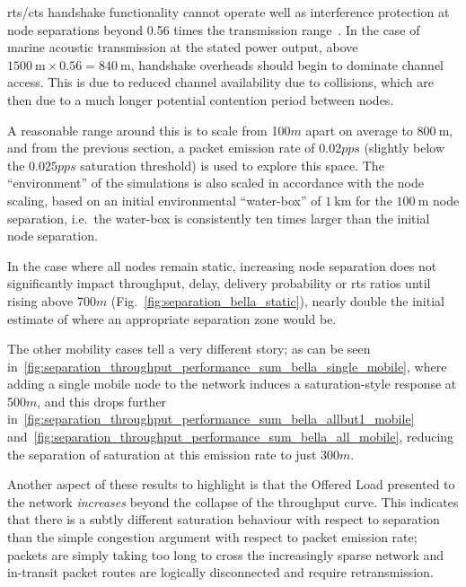 \gls{rts}/\gls{cts} handshake functionality cannot operate well as interference protection at node separations beyond 0.56 times the transmission range~\cite{Xu2002}.
In the case of marine acoustic transmission at the stated power output, above $\SI{1500}{\meter} \times 0.56 = \SI{840}{\meter}$, handshake overheads should begin to dominate channel access.
This is due to reduced channel availability due to collisions, which are then due to a much longer potential contention period between nodes. 

A reasonable range around this is to scale from 100$m$ apart on average to $\SI{800}{\meter}$, and from the previous section, a packet emission rate of $0.02pps$ (slightly below the $0.025pps$ saturation threshold) is used to explore this space.
The ``environment'' of the simulations is also scaled in accordance with the node scaling, based on an initial environmental ``water-box'' of $\SI{1}{\kilo\meter}$ for the $\SI{100}{\meter}$ node separation, i.e.\ the water-box is consistently ten times larger than the initial node separation.

In the case where all nodes remain static, increasing node separation does not significantly impact throughput, delay, delivery probability or \gls{rts} ratios until rising above 700$m$ (Fig.~\ref{fig:separation_bella_static}), nearly double the initial estimate of where an appropriate separation zone would be.

The other mobility cases tell a very different story; as can be seen in~\autoref{fig:separation_throughput_performance_sum_bella_single_mobile}, where adding a single mobile node to the network induces a saturation-style response at 500$m$, and this drops further in~\autoref{fig:separation_throughput_performance_sum_bella_allbut1_mobile} and~\autoref{fig:separation_throughput_performance_sum_bella_all_mobile}, reducing the separation of saturation at this emission rate to just 300$m$.

Another aspect of these results to highlight is that the Offered Load presented to the network \emph{increases} beyond the collapse of the throughput curve. 
This indicates that there is a subtly different saturation behaviour with respect to separation than the simple congestion argument with respect to packet emission rate; packets are simply taking too long to cross the increasingly sparse network and in-transit packet routes are logically disconnected and require retransmission.

